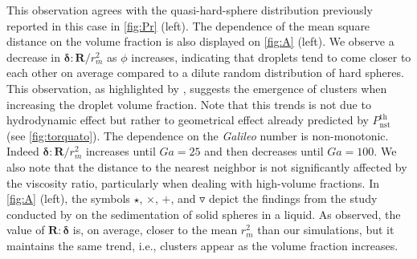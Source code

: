 This observation agrees with the quasi-hard-sphere distribution previously reported in this case in \ref{fig:Pr} (left).
The dependence of the mean square distance on the volume fraction is also displayed on \ref{fig:A} (left). 
We observe a decrease in $\bm\delta:\textbf{R}/r_m^2$ as $\phi$ increases, indicating that droplets tend to come closer to each other on average compared to a dilute random distribution of hard spheres. 
This observation, as highlighted by \citet{zhang2023evolution}, suggests the emergence of clusters when increasing the droplet volume fraction. 
Note that this trends is not due to hydrodynamic effect but rather to geometrical effect already predicted by $P_\text{nst}^\text{th}$ (see \ref{fig:torquato}). 
The dependence on the \textit{Galileo} number is non-monotonic. 
Indeed $\bm\delta:\textbf{R}/r_m^2$ increases until $Ga = 25$ and then decreases until $Ga = 100$. We also note that the distance to the nearest neighbor is not significantly affected by the viscosity ratio, particularly when dealing with high-volume fractions. 
In \ref{fig:A} (left), the symbols $\pmb\star$, $\pmb\times$, $\pmb +$, and $\pmb\triangledown$ depict the findings from the study conducted by \citet{zhang2023evolution} on the sedimentation of solid spheres in a liquid.
As observed, the value of $\textbf{R}:\bm\delta$ is, on average, closer to the mean $r_m^2$ than our simulations, but it maintains the same trend, i.e., clusters appear as the volume fraction increases.
 
